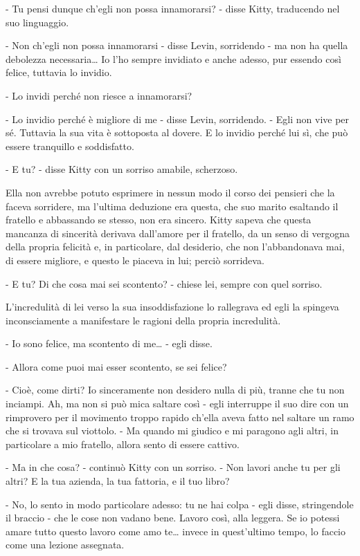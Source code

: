 - Tu pensi dunque ch'egli non possa innamorarsi? - disse Kitty, traducendo nel suo linguaggio. 

- Non ch'egli non possa innamorarsi - disse Levin, sorridendo - ma non ha quella debolezza necessaria\ldots{} Io l'ho sempre invidiato e anche adesso, pur essendo così felice, tuttavia lo invidio. 

- Lo invidi perché non riesce a innamorarsi? 

- Lo invidio perché è migliore di me - disse Levin, sorridendo. - Egli non vive per sé. Tuttavia la sua vita è sottoposta al dovere. E lo invidio perché lui sì, che può essere tranquillo e soddisfatto. 

- E tu? - disse Kitty con un sorriso amabile, scherzoso. 

Ella non avrebbe potuto esprimere in nessun modo il corso dei pensieri che la faceva sorridere, ma l'ultima deduzione era questa, che suo marito esaltando il fratello e abbassando se stesso, non era sincero. Kitty sapeva che questa mancanza di sincerità derivava dall'amore per il fratello, da un senso di vergogna della propria felicità e, in particolare, dal desiderio, che non l'abbandonava mai, di essere migliore, e questo le piaceva in lui; perciò sorrideva. 

- E tu? Di che cosa mai sei scontento? - chiese lei, sempre con quel sorriso. 

L'incredulità di lei verso la sua insoddisfazione lo rallegrava ed egli la spingeva inconsciamente a manifestare le ragioni della propria incredulità. 

- Io sono felice, ma scontento di me\ldots{} - egli disse. 

- Allora come puoi mai esser scontento, se sei felice? 

- Cioè, come dirti? Io sinceramente non desidero nulla di più, tranne che tu non inciampi. Ah, ma non si può mica saltare così - egli interruppe il suo dire con un rimprovero per il movimento troppo rapido ch'ella aveva fatto nel saltare un ramo che si trovava sul viottolo. - Ma quando mi giudico e mi paragono agli altri, in particolare a mio fratello, allora sento di essere cattivo. 

- Ma in che cosa? - continuò Kitty con un sorriso. - Non lavori anche tu per gli altri? E la tua azienda, la tua fattoria, e il tuo libro? 

- No, lo sento in modo particolare adesso: tu ne hai colpa - egli disse, stringendole il braccio - che le cose non vadano bene. Lavoro così, alla leggera. Se io potessi amare tutto questo lavoro come amo te\ldots{} invece in quest'ultimo tempo, lo faccio come una lezione assegnata. 

